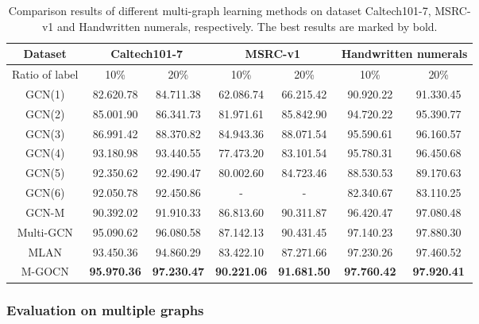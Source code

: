 \documentclass{article}
\begin{document}
\begin{table*}[htbp]\small
\centering
\caption{\upshape Comparison results of different multi-graph learning methods on dataset Caltech101-7, MSRC-v1 and Handwritten numerals, respectively. The best results are marked by bold.}
\begin{tabular}{c||c|c||c|c||c|c}
  \hline
  \hline
Dataset& \multicolumn{ 2}{c||}{Caltech101-7} & \multicolumn{ 2}{c||}{MSRC-v1} & \multicolumn{ 2}{c}{Handwritten numerals}\\
  \hline
  Ratio of label & 10\% & 20\%  & 10\% & 20\%  & 10\% & 20\% \\
  \hline
  GCN(1)   & 82.620.78 & 84.711.38  & 62.086.74 & 66.215.42 & 90.920.22 & 91.330.45\\
  GCN(2)  & 85.001.90 & 86.341.73  & 81.971.61 & 85.842.90 & 94.720.22 & 95.390.77\\
  GCN(3)   & 86.991.42 & 88.370.82  & 84.943.36 & 88.071.54 & 95.590.61 & 96.160.57\\
  GCN(4)   & 93.180.98 & 93.440.55  & 77.473.20 & 83.101.54 & 95.780.31 & 96.450.68\\
  GCN(5)   & 92.350.62 & 92.490.47  & 80.002.60 & 84.723.46 & 88.530.53 & 89.170.63\\
  GCN(6)   & 92.050.78 & 92.450.86  & - & - & 82.340.67 & 83.110.25\\
  GCN-M    & 90.392.02 & 91.910.33  & 86.813.60 & 90.311.87 & 96.420.47 & 97.080.48\\
  Multi-GCN   & 95.090.62 & 96.080.58  & 87.142.13 & 90.431.45 & 97.140.23 & 97.880.30\\
  MLAN  & 93.450.36 & 94.860.29  & 83.422.10 & 87.271.66 & 97.230.26 & 97.460.52\\
  \hline
  M-GOCN  & \textbf{95.970.36} & \textbf{97.230.47}  & \textbf{90.221.06} & \textbf{91.681.50}& \textbf{97.760.42} & \textbf{97.920.41} \\
  \hline
  \hline
\end{tabular}
\end{table*}
\subsubsection{Evaluation on multiple graphs}
\end{document}

